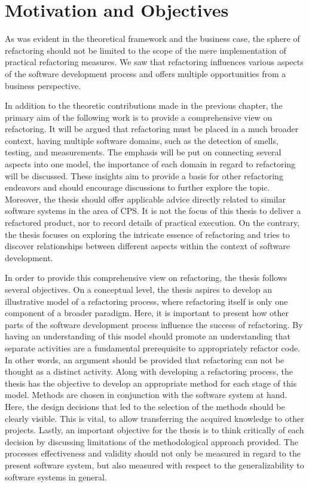 \section{Motivation and Objectives}
As was evident in the theoretical framework and the business case, the sphere of refactoring should not be limited to the scope of the mere implementation of practical refactoring measures. We saw that refactoring influences various aspects of the software development process and offers multiple opportunities from a business perspective. 

In addition to the theoretic contributions made in the previous chapter, the primary aim of the following work is to provide a comprehensive view on refactoring. It will be argued that refactoring must be placed in a much broader context, having multiple software domains, such as the detection of smells, testing, and measurements. The emphasis will be put on connecting several aspects into one model, the importance of each domain in regard to refactoring will be discussed. These insights aim to provide a basis for other refactoring endeavors and should encourage discussions to further explore the topic. Moreover, the thesis should offer applicable advice directly related to similar software systems in the area of CPS. It is not the focus of this thesis to deliver a refactored product, nor to record details of practical execution. On the contrary, the thesis focuses on exploring the intricate essence of refactoring and tries to discover relationships between different aspects within the context of software development.

In order to provide this comprehensive view on refactoring, the thesis follows several objectives. On a conceptual level, the thesis aspires to develop an illustrative model of a refactoring process, where refactoring itself is only one component of a broader paradigm. Here, it is important to present how other parts of the software development process influence the success of refactoring. By having an understanding of this model should promote an understanding that separate activities are a fundamental prerequisite to appropriately refactor code. In other words, an argument should be provided that refactoring can not be thought as a distinct activity. Along with developing a refactoring process, the thesis has the objective to develop an appropriate method for each stage of this model. Methods are chosen in conjunction with the software system at hand. Here, the design decisions that led to the selection of the methods should be clearly visible. This is vital, to allow transferring the acquired knowledge to other projects. Lastly, an important objective for the thesis is to think critically of each decision by discussing limitations of the methodological approach provided. The processes effectiveness and validity should not only be measured in regard to the present software system, but also measured with respect to the generalizability to software systems in general.
